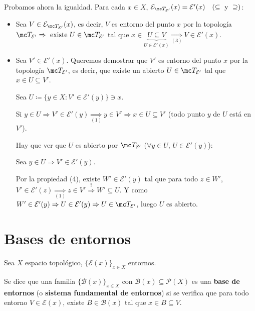 \begin{dem}
    Probamos ahora la igualdad. Para cada \(x \in X\), \(\mathcal{E}_{\mc T_{\mathcal{E}'}}(x) = \mathcal{E}'(x) \quad (\subseteq \text{ y } \supseteq)\):
    \begin{itemize}
        \item[\(\underline{\subseteq)}\)] Sea \(V \in \mathcal{E}_{\mc T_{\mathcal{E}'}}(x)\), es decir, \(V\) es entorno del punto \(x\) por la topología \(\mc T_{\mathcal{E}'} \Rightarrow \text{ existe } U \in \mc T_{\mathcal{E}'}\) tal que \(x \in \underbrace{U \subseteq V}_{U \in \mathcal{E}'(x)} \underset{(3)}{\Rightarrow} V \in \mathcal{E}'(x)\).
        
        \item[\(\underline{\supseteq)}\)] Sea \(V' \in \mathcal{E}'(x)\). Queremos demostrar que \(V'\) es entorno del punto \(x\) por la topología \(\mc T_{\mathcal{E}'}\), es decir, que existe un abierto \(U \in \mc T_{\mathcal{E}'}\) tal que \(x \in U \subseteq V'\).
        
        Sea \(U \coloneqq \{ y \in X : V' \in \mathcal{E}'(y) \} \ni x\).
        
        Si \(y \in U \Rightarrow V' \in \mathcal{E}'(y) \underset{(1)}{\Rightarrow} y \in V' \Rightarrow x \in U \subseteq V'\) (todo punto \(y\) de \(U\) está en \(V'\)).
        
        Hay que ver que \(U\) es abierto por \(\mc T_{\mathcal{E}'}\) (\(\forall y \in U, \, U \in \mathcal{E}'(y)\)):
        
        Sea \(y \in U \Rightarrow V' \in \mathcal{E}'(y)\).
        
        Por la propiedad (4), existe \(W' \in \mathcal{E}'(y)\) tal que para todo \(z \in W'\), \(V' \in \mathcal{E}'(z) \underset{(1)}{\Rightarrow} z \in V' \stackrel{?}{\Rightarrow} W' \subseteq U\). Y como \(W' \in \mathcal{E}'(y) \Rightarrow U \in \mathcal{E}'(y) \Rightarrow U \in \mc T_{\mathcal{E}'}\), luego \(U\) es abierto.
    \end{itemize}
\end{dem}

\section{Bases de entornos}

Sea \(X\) espacio topológico, \(\{\mathcal{E}(x)\}_{x \in X}\) entornos.

\begin{defi}
    Se dice que una familia \(\{\mathcal{B}(x)\}_{x \in X}\) con \(\mathcal{B}(x) \subseteq \mathcal{P}(X)\) es una \textbf{base de entornos} (o \textbf{sistema fundamental de entornos}) si se verifica que para todo entorno \(V \in \mathcal{E}(x)\), existe \(B \in \mathcal{B}(x)\) tal que \(x \in B \subseteq V\).
\end{defi}

